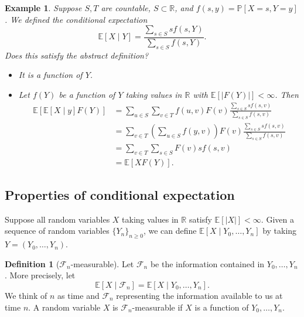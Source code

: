 \documentclass{tufte-handout}
\newcommand*\R{\mathbb{R}}
\newcommand*\E{\mathbb{E}}
\renewcommand*\P{\mathbb{P}}
\newtheorem{ex}[thm]{Example}
\theoremstyle{definition}
\newtheorem{defn}[thm]{Definition}
\begin{document}
\begin{ex}
	Suppose $S,T$ are countable, $S \subset \R$, and $f(s,y) = \P\left[X = s, Y = y\right] $.
	We defined the conditional expectation \[
		\E\left[X \mid Y\right]  = \frac{\sum\limits_{s\in S}^{} sf(s,Y)}{\sum\limits_{s\in S}^{} f(s,Y)}
	.\] Does this satisfy the abstract definition?
	\begin{itemize}
		\item It is a function of $Y$.
		\item Let $f(Y)$ be a function of $Y$ taking values in $\R$ with $\E\left[\left| F(Y) \right|\right] < \infty$. Then
			\begin{align*}
				\E\left[\E\left[X\mid y\right] F(Y)\right]  &= \sum\limits_{u \in S}^{} \sum\limits_{v \in T} f(u,v) F(v) \frac{\sum\limits_{s \in S}^{} s f(s,v)}{\sum\limits_{s\in S}^{} f(s,v)}\\
				&= \sum\limits_{v \in T}^{}  \left( \sum\limits_{u\in S}^{} f(y,v) \right) F(v) \frac{\sum\limits_{s \in S}^{} s f(s,v)}{\sum\limits_{s \in S}^{} f(s,v)}\\
				&= \sum\limits_{v \in T}^{} \sum\limits_{s \in S}^{} F(v) s f(s,v) \\
				&= \E\left[X F(Y)\right] 
			.\end{align*}
	\end{itemize}
\end{ex}

\subsection{Properties of conditional expectation}

Suppose all random variables $X$ taking values in $\R$ satisfy $\E\left[\left| X \right|\right] < \infty$. Given a sequence of random variables $\{Y_n\}_{n \ge 0}$, we can define $\E\left[X \mid Y_0,\ldots,Y_n\right] $ by taking $Y = \left( Y_0,\ldots,Y_n \right)$.

\begin{defn}[$\mathscr{F}_n$-measurable]
	Let $\mathscr{F}_n$ be the information contained in $Y_0,\ldots,Y_n$. More precisely, let \[
		\E\left[X \mid \mathscr{F}_n\right] = \E\left[X \mid Y_0,\ldots,Y_n\right] 
	.\] We think of $n$ as time and $\mathscr{F}_n$ representing the information available to us at time $n$. A random variable $X$ is $\mathscr{F}_n$-measurable if $X$ is a function of $Y_0,\ldots,Y_n$.
\end{defn}
\end{document}
